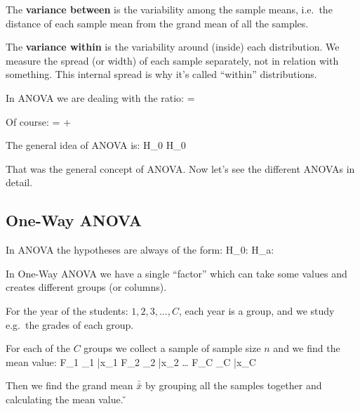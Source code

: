 The \textbf{variance between} is the variability among the sample means, i.e.\ the distance of each sample mean
from the grand mean of all the samples.
\ed

The \textbf{variance within} is the variability around (inside) each distribution. We measure the spread (or
width) of each sample separately, not in relation with something. This internal spread is why it's called
``within'' distributions.
\ed


In ANOVA we are dealing with the ratio:
\bse
{} = 
\ese

Of course:
\bse
{} =  + 
\ese

The general idea of ANOVA is:
\bse
{}  \imp {} H_{0} \qquad \qquad
{}  \imp {} H_{0}
\ese

That was the general concept of ANOVA. Now let's see the different ANOVAs in detail.

\subsection{One-Way ANOVA}

In ANOVA the hypotheses are always of the form:
\bse
H_{0}: 
\ese
\bse
H_{a}: 
\ese

In One-Way ANOVA we have a single ``factor'' which can take some values and creates different groups (or columns).

\be
For the year of the students: $1, 2, 3, \ldots, C$, each year is a group, and we study e.g.\ the grades of each
group.
\ee

For each of the $C$ groups we collect a sample of sample size $n$ and we find the mean value:
\bse
F_{1} \to {}_{1} \to \bar{x}_{1} \qquad
F_{2} \to {}_{2} \to \bar{x}_{2} \qquad \ldots \qquad
F_{C} \to {}_{C} \to \bar{x}_{C}
\ese

Then we find the grand mean $\bar{\bar{x}}$ by grouping all the samples together and calculating the mean value. \v

